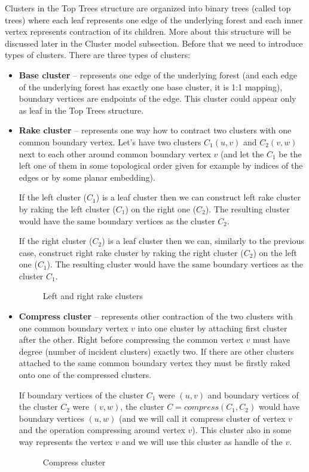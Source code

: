 Clusters in the Top Trees structure are organized into binary trees (called
{\I top trees}) where each leaf represents one edge of the underlying forest and
each inner vertex represents contraction of its children. More about this
structure will be discussed later in the {\I Cluster model} subsection. Before
that we need to introduce types of clusters. There are three types of clusters:
\begin{itemize}

\item {\bf Base cluster} -- represents one edge of the underlying forest (and
each edge of the underlying forest has exactly one base cluster, it is 1:1 mapping),
boundary vertices are endpoints of the edge.
This cluster could appear only as leaf in the Top Trees structure.

\item {\bf Rake cluster} -- represents one way how to contract two clusters
with one common boundary vertex. Let's have two clusters $C_1(u,v)$ and
$C_2(v,w)$ next to each other around common boundary vertex $v$ (and let the
$C_1$ be the left one of them in some topological order given for example by
indices of the edges or by some planar embedding).

If the left cluster ($C_1$) is a leaf cluster then we can construct {\I left
rake cluster} by {\I raking} the left cluster ($C_1$) on the right one ($C_2$).
The resulting cluster would have the same boundary vertices as the cluster $C_2$.

If the right cluster ($C_2$) is a leaf cluster then we can, similarly to the
previous case, construct {\I right rake cluster} by {\I raking} the right
cluster ($C_2$) on the left one ($C_1$). The resulting cluster would have the
same boundary vertices as the cluster $C_1$.

\begin{figure}[h]
\centering
{}
\caption{Left and right rake clusters}
\end{figure}

\item{\bf Compress cluster} -- represents other contraction of the two clusters
with one common boundary vertex $v$ into one cluster by attaching first cluster
after the other. Right before compressing the common vertex $v$ must have degree
(number of incident clusters) exactly two. If there are other clusters attached
to the same common boundary vertex they must be firstly {\I raked} onto one of
the compressed clusters.

If boundary vertices of the cluster $C_1$ were $(u,v)$ and boundary vertices
of the cluster $C_2$ were $(v,w)$, the cluster $C=compress(C_1,C_2)$ would have
boundary vertices $(u,w)$ (and we will call it {\I compress cluster
of vertex $v$} and the operation {\I compressing around vertex $v$}).
This cluster also in some way represents the vertex $v$ and we will use this
cluster as {\I handle} of the $v$.

\begin{figure}[H]
\centering
{}
\caption{Compress cluster}
\end{figure}

\end{itemize}

